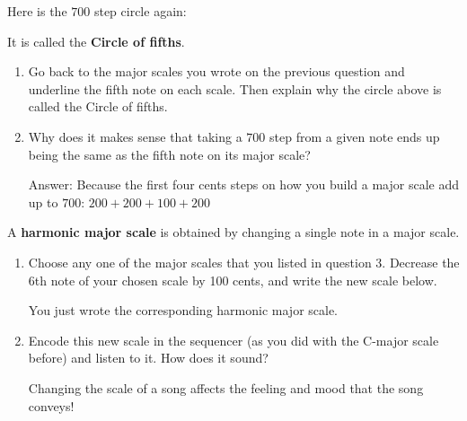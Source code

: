 \documentclass[12pt,noauthor,nooutcomes, instructornotes]{ximera}
\begin{document}
\begin{question}
Here is the $700$ step circle again:
\begin{center}
\newcommand*{\mynotes}{$C$,$G$,$D$,$A$,$E$,$B$,$F\sharp$,$C\sharp$,$G\sharp$,$D\sharp$,$A\sharp$,$F$}
\circleTour{\mynotes}{700}
\end{center}
It is called the \textbf{Circle of fifths}. 
\begin{enumerate}
    \item Go back to the major scales you wrote on the previous question and underline the fifth note on each scale. Then explain why the circle above is called the Circle of fifths.

\answerlines

\answerlines


    \item Why does it makes sense that taking a $700$ step from a given note ends up being the same as the fifth note on its major scale?
    \begin{instructorNotes}
    Answer: Because the first four cents steps on how you build a major scale add up to $700$: $200+200+100+200$
    \end{instructorNotes}
\end{enumerate}
\end{question}



\begin{question}
A \textbf{harmonic major scale} is obtained by changing a single note in a major scale.

\begin{enumerate}
    \item Choose any one of the major scales that you listed in question 3. Decrease the 6th note of your chosen scale by 100 cents, and write the new scale below.

\answerspace


    You just wrote the corresponding harmonic major scale.
    
    \item Encode this new scale in the sequencer (as you did with the C-major scale before) and listen to it. How does it sound?

\answerspace


\answerspace


\answerspace


    
    Changing the scale of a song affects the feeling and mood that the song conveys!
\end{enumerate}
\end{question}
\end{document}
